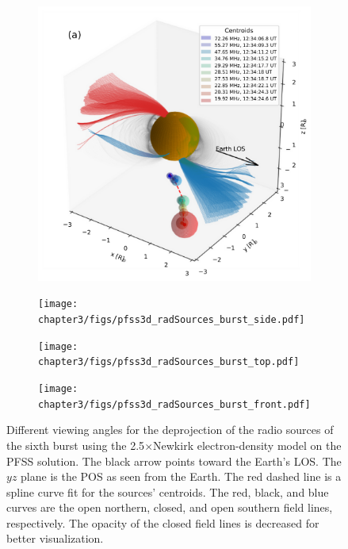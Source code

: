 \begin{figure}[ht]
	\centering
	\begin{subfigure}{0.45\linewidth}
		\centering
		\includegraphics[width=\linewidth]{chapter3/figs/pfss3d_radSources_burst_angle.pdf}
		\label{subfig:a}
	\end{subfigure}
	\hfill
	\begin{subfigure}{0.45\linewidth}
		\centering
		\texttt{[image: chapter3/figs/pfss3d\_radSources\_burst\_side.pdf]}
		\label{subfig:b}
	\end{subfigure}
	
	\begin{subfigure}{0.45\linewidth}
		\centering
		\texttt{[image: chapter3/figs/pfss3d\_radSources\_burst\_top.pdf]}
		\label{subfig:c}
	\end{subfigure}
	\hfill
	\begin{subfigure}{0.45\linewidth}
		\centering
		\texttt{[image: chapter3/figs/pfss3d\_radSources\_burst\_front.pdf]}
		\label{subfig:d}
	\end{subfigure}
	\caption{Different viewing angles for the deprojection of the radio sources of the sixth burst using the 2.5$\times$Newkirk electron-density model on the PFSS solution. The black arrow points toward the Earth's LOS. The $yz$ plane is the POS as seen from the Earth. The red dashed line is a spline curve fit for the sources' centroids. The red, black, and blue curves are the open northern, closed, and open southern field lines, respectively. The opacity of the closed field lines is decreased for better visualization.}
	\label{fig_3figs}
\end{figure}

